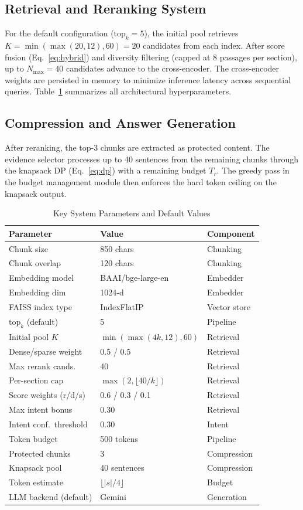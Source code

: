 \documentclass[conference]{IEEEtran}
\begin{document}
\subsection{Retrieval and Reranking System}
For the default configuration ($\mathrm{top}_k = 5$), the initial pool retrieves
$K = \min(\max(20,12),60) = 20$ candidates from each index. After score fusion (Eq.~\ref{eq:hybrid}) and diversity
filtering (capped at 8 passages per section), up
to $N_{\max}=40$ candidates advance to the
cross-encoder. The cross-encoder weights are persisted in memory to minimize inference latency across sequential queries. Table~\ref{tab:params} summarizes all architectural hyperparameters.

\subsection{Compression and Answer Generation}
After reranking, the top-3 chunks are extracted as protected
content. The evidence selector processes up to 40 sentences
from the remaining chunks through the knapsack DP
(Eq.~\ref{eq:dp}) with a remaining budget $T_r$. The greedy
pass in the budget management module then enforces the hard
token ceiling on the knapsack output.

\begin{table}[!t]
\centering
\caption{Key System Parameters and Default Values}
\label{tab:params}
\begin{tabular}{@{}lll@{}}
\toprule
\textbf{Parameter} & \textbf{Value} & \textbf{Component} \\
\midrule
Chunk size & 850 chars & Chunking \\
Chunk overlap & 120 chars & Chunking \\
Embedding model & BAAI/bge-large-en & Embedder \\
Embedding dim & 1024-d & Embedder \\
FAISS index type & IndexFlatIP & Vector store \\
$\mathrm{top}_k$ (default) & 5 & Pipeline \\
Initial pool $K$ & $\min(\max(4k,12),60)$ & Retrieval \\
Dense/sparse weight & 0.5 / 0.5 & Retrieval \\
Max rerank cands. & 40 & Retrieval \\
Per-section cap & $\max(2,\lfloor 40/k\rfloor)$ & Retrieval \\
Score weights (r/d/s) & 0.6 / 0.3 / 0.1 & Retrieval \\
Max intent bonus & 0.30 & Retrieval \\
Intent conf.~threshold & 0.30 & Intent \\
Token budget & 500 tokens & Pipeline \\
Protected chunks & 3 & Compression \\
Knapsack pool & 40 sentences & Compression \\
Token estimate & $\lfloor|s|/4\rfloor$ & Budget \\
LLM backend (default) & Gemini & Generation \\
\bottomrule
\end{tabular}
\end{table}
\end{document}
